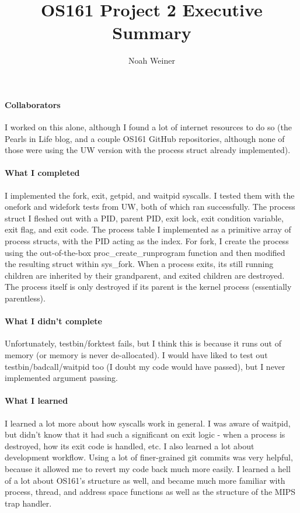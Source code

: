 \documentclass{article}
\title{OS161 Project 2 Executive Summary}
\author{Noah Weiner}
\date{}
\begin{document}
\maketitle

\paragraph{Collaborators} I worked on this alone, although I found a lot of internet resources to do so (the Pearls in Life blog, and a couple OS161 GitHub repositories, although none of those were using the UW version with the process struct already implemented).

\paragraph{What I completed} I implemented the fork, exit, getpid, and waitpid syscalls. I tested them with the onefork and widefork tests from UW, both of which ran successfully. The process struct I fleshed out with a PID, parent PID, exit lock, exit condition variable, exit flag, and exit code. The process table I implemented as a primitive array of process structs, with the PID acting as the index. For fork, I create the process using the out-of-the-box proc\_create\_runprogram function and then modified the resulting struct within sys\_fork. When a process exits, its still running children are inherited by their grandparent, and exited children are destroyed. The process itself is only destroyed if its parent is the kernel process (essentially parentless).

\paragraph{What I didn't complete} Unfortunately, testbin/forktest fails, but I think this is because it runs out of memory (or memory is never de-allocated).  I would have liked to test out testbin/badcall/waitpid too (I doubt my code would have passed), but I never implemented argument passing.
 
\paragraph{What I learned} I learned a lot more about how syscalls work in general. I was aware of waitpid, but didn't know that it had such a significant on exit logic - when a process is destroyed, how its exit code is handled, etc. I also learned a lot about development workflow. Using a lot of finer-grained git commits was very helpful, because it allowed me to revert my code back much more easily. I learned a hell of a lot about OS161's structure as well, and became much more familiar with process, thread, and address space functions as well as the structure of the MIPS trap handler.
\end{document}
